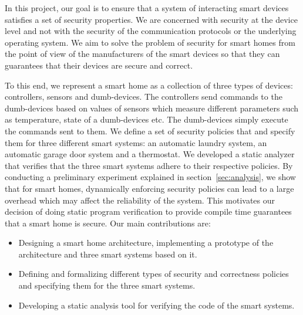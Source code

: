 \documentclass{article}
\begin{document}
In this project, our goal is to ensure that a system of interacting smart devices satisfies a set of security properties. We are concerned with security at the device level and not with the security of the communication protocols or the underlying operating system. We aim to solve the problem of security for smart homes from the point of view of the manufacturers of the smart devices so that they can guarantees that their devices are secure and correct. 

To this end, we represent a smart home as a collection of three types of devices: controllers, sensors and dumb-devices. The controllers send commands to the dumb-devices based on values of sensors which measure different parameters such as temperature, state of a dumb-devices etc. The dumb-devices simply execute the commands sent to them.
We define a set of security policies that and specify them for three different smart systems: an automatic laundry system, an automatic garage door system and a thermostat. We developed a static analyzer that verifies that the three smart systems adhere to their respective policies. By conducting a preliminary experiment explained in section~\ref{sec:analysis}, we show that for smart homes, dynamically enforcing security policies can lead to a large overhead which may affect the reliability of the system. This motivates our decision of doing static program verification to provide compile time guarantees that a smart home is secure. Our main contributions are:
\begin{itemize}[topsep=0pt,itemsep=0ex,partopsep=1ex,parsep=1ex]
    \item Designing a smart home architecture, implementing a prototype of the architecture and three smart systems based on it.
    \item Defining and formalizing different types of security and correctness policies and specifying them for the three smart systems.
    \item Developing a static analysis tool for verifying the code of the smart systems.
\end{itemize}
  
\end{document}
